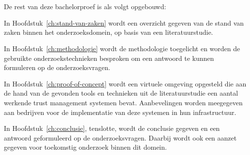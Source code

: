 \section{}%
\label{sec:opzet-bachelorproef}


De rest van deze bachelorproef is als volgt opgebouwd:

In Hoofdstuk~\ref{ch:stand-van-zaken} wordt een overzicht gegeven van de stand van zaken binnen het onderzoeksdomein, op basis van een literatuurstudie.

In Hoofdstuk~\ref{ch:methodologie} wordt de methodologie toegelicht en worden de gebruikte onderzoekstechnieken besproken om een antwoord te kunnen formuleren op de onderzoeksvragen.


In Hoofdstuk~\ref{ch:proof-of-concept} wordt een virtuele omgeving opgesteld die aan de hand van de gevonden tools en technieken uit de literatuurstudie een aantal werkende trust management systemen bevat. Aanbevelingen worden meegegeven aan bedrijven voor de implementatie van deze systemen in hun infrastructuur.

In Hoofdstuk~\ref{ch:conclusie}, tenslotte, wordt de conclusie gegeven en een antwoord geformuleerd op de onderzoeksvragen. Daarbij wordt ook een aanzet gegeven voor toekomstig onderzoek binnen dit domein.